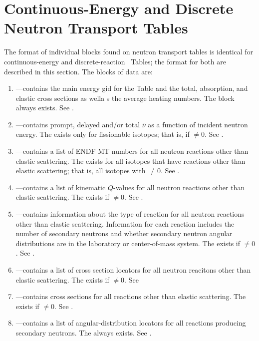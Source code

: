 \section{Continuous-Energy and Discrete Neutron Transport Tables}\label{sec:ContinuousEnergyNeutron}
The format of individual blocks found on neutron transport tables is identical for continuous-energy and discrete-reaction \ACE\ Tables; the format for both are described in this section. The blocks of data are:
\begin{enumerate}
  \item \textbf{}---contains the main energy gid for the Table and the total, absorption, and elastic cross sections as wella s the average heating numbers. The  block always exists. See .
  \item \textbf{}---contains prompt, delayed and/or total $\overline{\nu}$ as a function of incident neutron energy. The  exists only for fissionable isotopes; that is, if $\neq0$. See .
  \item \textbf{}---contains a list of ENDF MT numbers for all neutron reactions other than elastic scattering. The  exists for all isotopes that have reactions other than elastic scattering; that is, all isotopes with $\neq0$. See .
  \item \textbf{}---contains a list of kinematic $Q$-values for all neutron reactions other than elastic scattering. The  exists if $\neq0$. See .
  \item \textbf{}---contains information about the type of reaction for all neutron reactions other than elastic scattering. Information for each reaction includes the number of secondary neutrons and whether secondary neutron angular distributions are in the laboratory or center-of-mass system. The  exists if $\neq0$. See .
  \item \textbf{}---contains a list of cross section locators for all neutron reacitons other than elastic scattering. The  exists if $\neq0$. See 
  \item \textbf{}---contains cross sections for all reactions other than elastic scattering. The  exists if $\neq0$. See .
  \item \textbf{}---contains a list of angular-distribution locators for all reactions producing secondary neutrons. The  always exists. See .

\end{enumerate}
